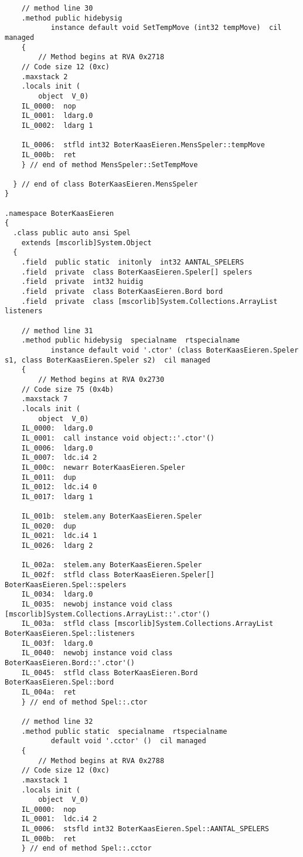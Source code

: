 \begin{lstlisting}
    // method line 30
    .method public hidebysig 
           instance default void SetTempMove (int32 tempMove)  cil managed 
    {
        // Method begins at RVA 0x2718
	// Code size 12 (0xc)
	.maxstack 2
	.locals init (
		object	V_0)
	IL_0000:  nop 
	IL_0001:  ldarg.0 
	IL_0002:  ldarg 1

	IL_0006:  stfld int32 BoterKaasEieren.MensSpeler::tempMove
	IL_000b:  ret 
    } // end of method MensSpeler::SetTempMove

  } // end of class BoterKaasEieren.MensSpeler
}

.namespace BoterKaasEieren
{
  .class public auto ansi Spel
  	extends [mscorlib]System.Object
  {
    .field  public static  initonly  int32 AANTAL_SPELERS
    .field  private  class BoterKaasEieren.Speler[] spelers
    .field  private  int32 huidig
    .field  private  class BoterKaasEieren.Bord bord
    .field  private  class [mscorlib]System.Collections.ArrayList listeners

    // method line 31
    .method public hidebysig  specialname  rtspecialname 
           instance default void '.ctor' (class BoterKaasEieren.Speler s1, class BoterKaasEieren.Speler s2)  cil managed 
    {
        // Method begins at RVA 0x2730
	// Code size 75 (0x4b)
	.maxstack 7
	.locals init (
		object	V_0)
	IL_0000:  ldarg.0 
	IL_0001:  call instance void object::'.ctor'()
	IL_0006:  ldarg.0 
	IL_0007:  ldc.i4 2
	IL_000c:  newarr BoterKaasEieren.Speler
	IL_0011:  dup 
	IL_0012:  ldc.i4 0
	IL_0017:  ldarg 1

	IL_001b:  stelem.any BoterKaasEieren.Speler
	IL_0020:  dup 
	IL_0021:  ldc.i4 1
	IL_0026:  ldarg 2

	IL_002a:  stelem.any BoterKaasEieren.Speler
	IL_002f:  stfld class BoterKaasEieren.Speler[] BoterKaasEieren.Spel::spelers
	IL_0034:  ldarg.0 
	IL_0035:  newobj instance void class [mscorlib]System.Collections.ArrayList::'.ctor'()
	IL_003a:  stfld class [mscorlib]System.Collections.ArrayList BoterKaasEieren.Spel::listeners
	IL_003f:  ldarg.0 
	IL_0040:  newobj instance void class BoterKaasEieren.Bord::'.ctor'()
	IL_0045:  stfld class BoterKaasEieren.Bord BoterKaasEieren.Spel::bord
	IL_004a:  ret 
    } // end of method Spel::.ctor

    // method line 32
    .method public static  specialname  rtspecialname 
           default void '.cctor' ()  cil managed 
    {
        // Method begins at RVA 0x2788
	// Code size 12 (0xc)
	.maxstack 1
	.locals init (
		object	V_0)
	IL_0000:  nop 
	IL_0001:  ldc.i4 2
	IL_0006:  stsfld int32 BoterKaasEieren.Spel::AANTAL_SPELERS
	IL_000b:  ret 
    } // end of method Spel::.cctor


\end{lstlisting}
